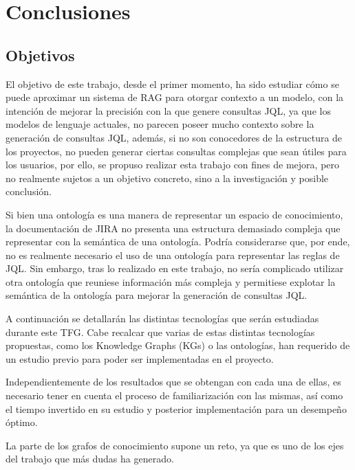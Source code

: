 \section{Conclusiones}
\subsection{Objetivos}
El objetivo de este trabajo, desde el primer momento, ha sido estudiar cómo se puede aproximar un sistema de RAG para otorgar contexto a un modelo, con la intención de mejorar la precisión con la que genere consultas JQL, ya que los modelos de lenguaje actuales, no parecen poseer mucho contexto sobre la generación de consultas JQL, además, si no son conocedores de la estructura de los proyectos, no pueden generar ciertas consultas complejas que sean útiles para los usuarios, por ello, se propuso realizar esta trabajo con fines de mejora, pero no realmente sujetos a un objetivo concreto, sino a la investigación y posible conclusión.

Si bien una ontología es una manera de representar un espacio de conocimiento, la documentación de JIRA no presenta una estructura demasiado compleja que representar con la semántica de una ontología. Podría considerarse que, por ende, no es realmente necesario el uso de una ontología para representar las reglas de JQL. Sin embargo, tras lo realizado en este trabajo, no sería complicado utilizar otra ontología que reuniese información más compleja y permitiese explotar la semántica de la ontología para mejorar la generación de consultas JQL.




A continuación se detallarán las distintas tecnologías que serán estudiadas durante este TFG. Cabe recalcar que varias de estas distintas tecnologías propuestas, como los Knowledge Graphs (KGs) o las ontologías, han requerido de un estudio previo para poder ser implementadas en el proyecto.

Independientemente de los resultados que se obtengan con cada una de ellas, es necesario tener en cuenta el proceso de familiarización con las mismas, así como el tiempo invertido en su estudio y posterior implementación para un desempeño óptimo.

La parte de los grafos de conocimiento supone un reto, ya que es uno de los ejes del trabajo que más dudas ha generado.




